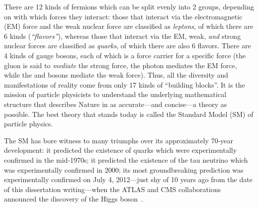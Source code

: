 There are 12 kinds of fermions which can be split evenly into 2 groups, depending on with which forces they interact:
those that interact via the electromagnetic (EM) force and the weak nuclear force are classified as \emph{leptons}, of which there are 6 kinds (\emph{``flavors''}),
whereas those that interact via the EM, weak, \emph{and} strong nuclear forces are classified as \emph{quarks}, of which there are also 6 flavors.
There are 4 kinds of gauge bosons, each of which is a force carrier for a specific force
(the gluon is said to \emph{mediate} the strong force, the photon mediates the EM force, while the \PWpm and \PZ bosons mediate the weak force).
Thus, all the diversity and manifestations of reality come from only 17 kinds of ``building blocks''.
It is the mission of particle physicists to understand the underlying mathematical structure that describes Nature in as accurate---and concise---a theory as possible.
The best theory that stands today is called the Standard Model (SM) of particle physics.

The SM has bore witness to many triumphs over its approximately 70-year development:
it predicted the existence of quarks which were experimentally confirmed in the mid-1970s;
it predicted the existence of the tau neutrino which was experimentally confirmed in 2000;
its most groundbreaking prediction was experimentally confirmed on July 4, 2012---just shy of 10 years ago from the date of this dissertation writing---when the ATLAS and CMS collaborations announced the discovery of the Higgs boson~\cite{chatrchyan_observation_2012, aad_observation_2012, chatrchyan_observation_2013}.

